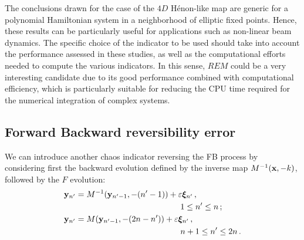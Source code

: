 The conclusions drawn for the case of the $4D$ H\'enon-like map are generic for a polynomial Hamiltonian system in a neighborhood of elliptic fixed points. Hence, these results can be particularly useful for applications such as non-linear beam dynamics. The specific choice of the indicator to be used should take into account the performance assessed in these studies, as well as the computational efforts needed to compute the various indicators. In this sense, $REM$ could be a very interesting candidate due to its good performance combined with computational efficiency, which is particularly suitable for reducing the CPU time required for the numerical integration of complex systems.
%
\begin{chapterappendices}{}
\section{Forward Backward reversibility error\label{subsec:fb}}
%
We can introduce another chaos indicator reversing the FB process by considering first the backward evolution defined by the inverse map
$M^{-1}(\vb{x},-k)$, followed by the $F$ evolution:
%
\begin{equation}
 \begin{split}
   &\vb{y}_{n'}  = M^{-1}(\vb{y}_{n'-1},-(n'-1)) +\eps\boldsymbol{\xi}_{n'}\, , \\
   & \hskip 5 truecm  1\le n'\le n \, ; \\  
   &\vb{y}_{n'} = M(\vb{y}_{ n'-1}, -(2n-n'))+\eps   \boldsymbol{\xi}_{n' } \, , \\
   & \hskip 5 truecm n+1\le n'\le 2n \, .
  \end{split}
\label{eq2-14}
\end{equation}
%


\end{chapterappendices}
